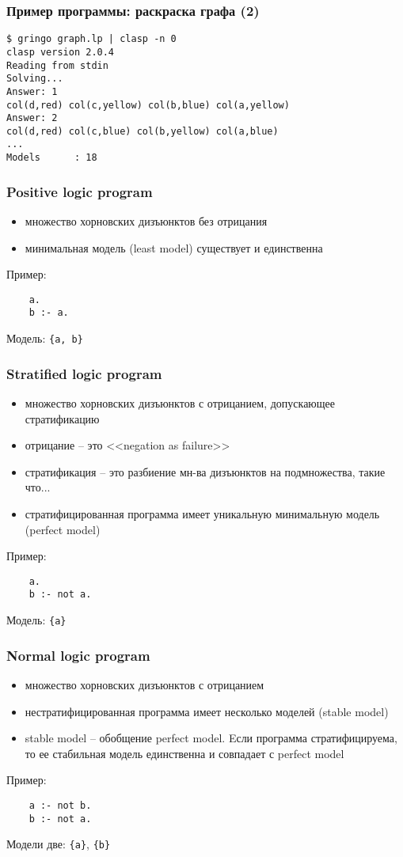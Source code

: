 \documentclass{beamer}
\begin{document}
\begin{frame}[fragile]
\frametitle{Пример программы: раскраска графа (2)}
{\footnotesize \begin{verbatim}
$ gringo graph.lp | clasp -n 0
clasp version 2.0.4
Reading from stdin
Solving...
Answer: 1
col(d,red) col(c,yellow) col(b,blue) col(a,yellow)
Answer: 2
col(d,red) col(c,blue) col(b,yellow) col(a,blue)
...
Models      : 18
\end{verbatim}}
\end{frame}


\begin{frame}[fragile]
\frametitle{Positive logic program}
\begin{itemize}
  \item множество хорновских дизъюнктов без отрицания
  \item минимальная модель (least model) существует и единственна
\end{itemize}\bigskip

Пример: 
{\footnotesize \begin{verbatim} 
    a. 
    b :- a.
\end{verbatim}}

Модель: \texttt{\{a, b\}}
\end{frame}

\begin{frame}[fragile]
\frametitle{Stratified logic program}
\begin{itemize}
  \item множество хорновских дизъюнктов с отрицанием, допускающее стратификацию
  \item отрицание -- это <<negation as failure>>
  \item стратификация -- это разбиение мн-ва дизъюнктов на подмножества, такие что...
  \item стратифицированная программа имеет уникальную минимальную модель (perfect model)
\end{itemize}\bigskip

Пример:
{\footnotesize \begin{verbatim} 
    a.
    b :- not a.
\end{verbatim}}

Модель: \texttt{\{a\}}
\end{frame}

\begin{frame}[fragile]
\frametitle{Normal logic program}
\begin{itemize}
  \item множество хорновских дизъюнктов с отрицанием
  \item нестратифицированная программа имеет несколько моделей (stable model)
  \item stable model -- обобщение perfect model. Eсли программа стратифицируема, то ее стабильная модель единственна и совпадает с perfect model
\end{itemize}\bigskip

Пример: 
{\footnotesize \begin{verbatim} 
    a :- not b. 
    b :- not a.
\end{verbatim}}

Модели две: \texttt{\{a\}}, \texttt{\{b\}}
\end{frame}
\end{document}
